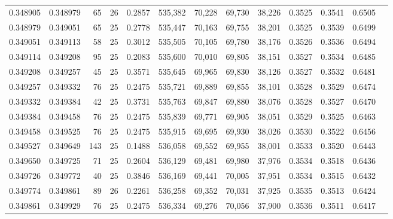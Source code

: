 \begin{tabular}{rrrrrrrrrrrrr}
0.348905 & 0.348979 &    65 &  26 &                                     0.2857 & 535,382 &  70,228 &  69,730 &  38,226 & 0.3525 & 0.3541 & 0.6505 \\
0.348979 & 0.349051 &    65 &  25 &                                     0.2778 & 535,447 &  70,163 &  69,755 &  38,201 & 0.3525 & 0.3539 & 0.6499 \\
0.349051 & 0.349113 &    58 &  25 &                                     0.3012 & 535,505 &  70,105 &  69,780 &  38,176 & 0.3526 & 0.3536 & 0.6494 \\
0.349114 & 0.349208 &    95 &  25 &                                     0.2083 & 535,600 &  70,010 &  69,805 &  38,151 & 0.3527 & 0.3534 & 0.6485 \\
0.349208 & 0.349257 &    45 &  25 &                                     0.3571 & 535,645 &  69,965 &  69,830 &  38,126 & 0.3527 & 0.3532 & 0.6481 \\
0.349257 & 0.349332 &    76 &  25 &                                     0.2475 & 535,721 &  69,889 &  69,855 &  38,101 & 0.3528 & 0.3529 & 0.6474 \\
0.349332 & 0.349384 &    42 &  25 &                                     0.3731 & 535,763 &  69,847 &  69,880 &  38,076 & 0.3528 & 0.3527 & 0.6470 \\
0.349384 & 0.349458 &    76 &  25 &                                     0.2475 & 535,839 &  69,771 &  69,905 &  38,051 & 0.3529 & 0.3525 & 0.6463 \\
0.349458 & 0.349525 &    76 &  25 &                                     0.2475 & 535,915 &  69,695 &  69,930 &  38,026 & 0.3530 & 0.3522 & 0.6456 \\
0.349527 & 0.349649 &   143 &  25 &                                     0.1488 & 536,058 &  69,552 &  69,955 &  38,001 & 0.3533 & 0.3520 & 0.6443 \\
0.349650 & 0.349725 &    71 &  25 &                                     0.2604 & 536,129 &  69,481 &  69,980 &  37,976 & 0.3534 & 0.3518 & 0.6436 \\
0.349726 & 0.349772 &    40 &  25 &                                     0.3846 & 536,169 &  69,441 &  70,005 &  37,951 & 0.3534 & 0.3515 & 0.6432 \\
0.349774 & 0.349861 &    89 &  26 &                                     0.2261 & 536,258 &  69,352 &  70,031 &  37,925 & 0.3535 & 0.3513 & 0.6424 \\
0.349861 & 0.349929 &    76 &  25 &                                     0.2475 & 536,334 &  69,276 &  70,056 &  37,900 & 0.3536 & 0.3511 & 0.6417 \\

\end{tabular}
